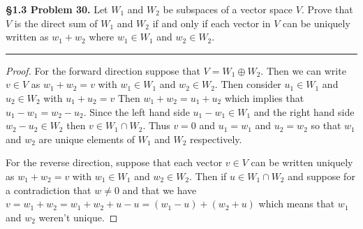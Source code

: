\documentclass[leqno]{article}
\theoremstyle{nonumberplain}
\newtheorem{proof}{Proof}
\begin{document}


\noindent\textbf{\S 1.3 Problem 30.} Let $W_1$ and $W_2$ be subspaces of a vector space $V$. Prove that $V$ is the direct sum of $W_1$ and $W_2$ if and only if each vector in $V$ can be uniquely written as $w_1+w_2$ where $w_1 \in W_1$ and $w_2 \in W_2$.

\noindent\rule[0.5ex]{\linewidth}{1pt}

\begin{proof}
For the forward direction suppose that $V=W_1\oplus W_2$.  Then we can write $v\in V$ as $w_1+w_2=v$ with $w_1\in W_1$ and $w_2\in W_2$.  Then consider $u_1\in W_1$ and $u_2 \in W_2$ with $u_1+u_2=v$  Then $w_1+w_2=u_1+u_2$ which implies that $u_1-w_1=w_2-u_2$. Since the left hand side $u_1-w_1\in W_1$ and the right hand side $w_2-u_2\in W_2$ then $v\in W_1\cap W_2$.  Thus $v=0$ and $u_1=w_1$ and $u_2=w_2$ so that $w_1$ and $w_2$ are unique elements of $W_1$ and $W_2$ respectively.

For the reverse direction, suppose that each vector $v\in V$ can be written uniquely as $w_1+w_2=v$ with $w_1\in W_1$ and $w_2\in W_2$.  Then if $u\in W_1\cap W_2$ and suppose for a contradiction that $w\neq 0$ and that we have $v=w_1+w_2=w_1+w_2+u-u=(w_1-u)+(w_2+u)$ which means that $w_1$ and $w_2$ weren't unique.


\end{proof}
\pagebreak


\end{document}
